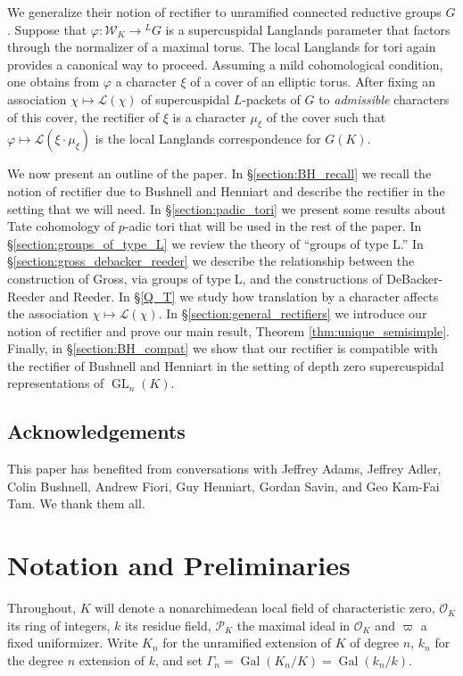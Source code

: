 \documentclass[11pt]{amsart}
\theoremstyle{plain}
\theoremstyle{definition}
\DeclareMathOperator{\Gal}{Gal}
\DeclareMathOperator{\GL}{GL}
\newcommand{\OK}{\mathcal{O}_K}
\newcommand{\PK}{\mathcal{P}_K}
\newcommand{\Weil}{\mathcal{W}}
\newcommand{\Lpack}{\mathcal{L}}
\begin{document}
We generalize their notion of rectifier to unramified connected reductive groups $G$.
Suppose that $\varphi : \Weil_K \rightarrow {}^L G$ is a supercuspidal Langlands parameter
that factors through the normalizer of a maximal torus.
The local Langlands for tori again provides a canonical way to proceed.  Assuming a mild
cohomological condition, one
obtains from $\varphi$ a character $\xi$ of a cover of an elliptic torus.
After fixing an association $\chi \mapsto \Lpack(\chi)$ of supercuspidal $L$-packets of $G$
to \emph{admissible} characters of this cover, the rectifier of $\xi$ is a character
$\mu_{\xi}$ of the cover such that $\varphi \mapsto \Lpack(\xi \cdot \mu_{\xi})$
is the local Langlands correspondence for $G(K)$.

We now present an outline of the paper.  In \S\ref{section:BH_recall} we recall
the notion of rectifier due to Bushnell and Henniart and describe
the rectifier in the setting that we will need.  In \S\ref{section:padic_tori}
we present some results about Tate cohomology of $p$-adic tori that will be used
in the rest of the paper.  In \S\ref{section:groups_of_type_L} we review
the theory of ``groups of type L.''  In
\S\ref{section:gross_debacker_reeder} we describe the relationship between the
construction of Gross, via groups of type L, and the constructions of
DeBacker-Reeder and Reeder.  In \S\ref{Q_T} we study how translation by a character affects
the association $\chi \mapsto \Lpack(\chi)$.
In \S\ref{section:general_rectifiers} we
introduce our notion of rectifier and prove our main result, Theorem \ref{thm:unique_semisimple}.
Finally, in \S\ref{section:BH_compat} we show that our rectifier is compatible with
the rectifier of Bushnell and Henniart in the setting of depth zero
supercuspidal representations of $\GL_n(K)$.

\subsection*{Acknowledgements}

This paper has benefited from conversations with Jeffrey Adams, Jeffrey Adler, Colin Bushnell, Andrew Fiori, Guy Henniart, Gordan Savin, and Geo Kam-Fai Tam.  We thank them all.

\section{Notation and Preliminaries} \label{section:notation}

Throughout, $K$ will denote a nonarchimedean local field of
characteristic zero, $\OK$ its ring of integers, $k$ its residue field,
$\PK$ the maximal ideal in $\OK$ and $\varpi$ a fixed uniformizer.
Write $K_n$ for the unramified extension of $K$ of degree $n$, $k_n$ for
the degree $n$ extension of $k$,
and set $\Gamma_n = \Gal(K_n/K) = \Gal(k_n/k)$.
\end{document}

